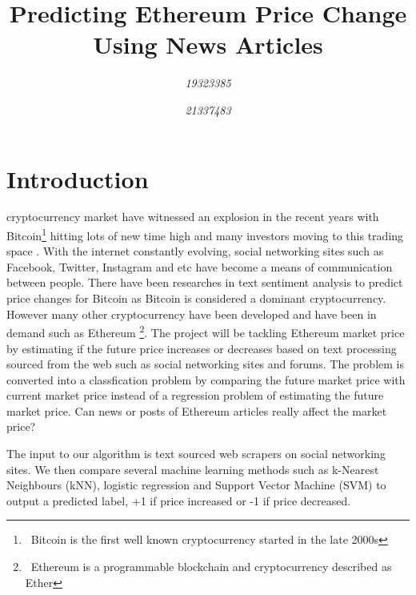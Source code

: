 \documentclass[transmag]{IEEEtran}
\begin{document}
\title{Predicting Ethereum Price Change Using News Articles}

\author{
\textit{19323385}
\and
{}
\textit{21337483}
\and
{}
}




\maketitle
\thispagestyle{plain}
\pagestyle{plain}


\section{Introduction}
 cryptocurrency market have witnessed an explosion in the recent years with Bitcoin\footnote{\ Bitcoin is the first well known cryptocurrency started in the late 2000s} hitting lots of new time high and many investors moving to this trading space \cite{huy2019predicting}. With the internet constantly evolving, social networking sites such as Facebook, Twitter, Instagram and etc have become a means of communication between people. There have been researches in text sentiment analysis to predict price changes for Bitcoin \cite{huy2019predicting}\cite{sattarov2020forecasting} as Bitcoin is considered a dominant cryptocurrency. However many other cryptocurrency have been developed and have been in demand such as Ethereum \footnote{\ Ethereum is a programmable blockchain and cryptocurrency described as Ether}. The project will be tackling Ethereum market price by estimating if the future price increases or decreases based on text processing sourced from the web such as social networking sites and forums. The problem is converted into a classfication problem by comparing the future market price with current market price instead of a regression problem of estimating the future market price. Can news or posts of Ethereum articles really affect the market price?

The input to our algorithm is text sourced web scrapers on social networking sites. We then compare several machine learning methods such as k-Nearest Neighbours (kNN), logistic regression and Support Vector Machine (SVM) to output a predicted label, +1 if price increased or -1 if price decreased.
\end{document}
